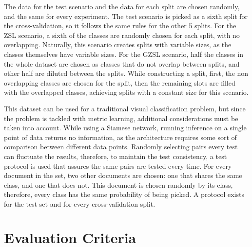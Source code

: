 The data for the test scenario and the data for each split are chosen randomly, and the same for every experiment. The test scenario is picked as a sixth split for the cross-validation, so it follows the same rules for the other 5 splits. For the \gls{ZSL} scenario, a sixth of the classes are randomly chosen for each split, with no overlapping. Naturally, this scenario creates splits with variable sizes, as the classes themselves have variable sizes. For the \gls{GZSL} scenario, half the classes in the whole dataset are chosen as classes that do not overlap between splits, and other half are diluted between the splits. While constructing a split, first, the non overlapping classes are chosen for the split, then the remaining slots are filled with the overlapped classes, achieving splits with a constant size for this scenario.

This dataset can be used for a traditional visual classification problem, but since the problem is tackled with metric learning, additional considerations must be taken into account. While using a Siamese network, running inference on a single point of data returns no information, as the architecture requires some sort of comparison between different data points. Randomly selecting pairs every test can fluctuate the results, therefore, to maintain the test consistency, a test protocol is used that assures the same pairs are tested every time. For every document in the set, two other documents are chosen: one that shares the same class, and one that does not. This document is chosen randomly by its class, therefore, every class has the same probability of being picked. A protocol exists for the test set and for every cross-validation split.


\section{Evaluation Criteria}
\label{sec:evaluation}

